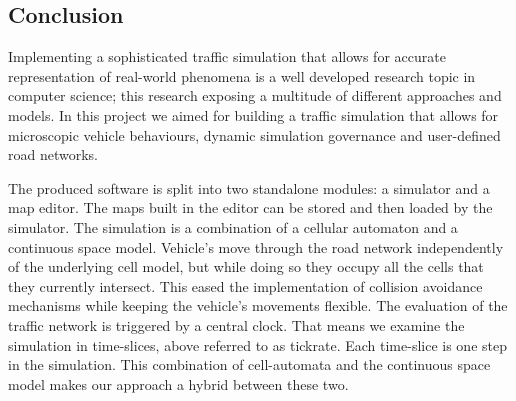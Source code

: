 \subsection*{Conclusion}
Implementing a sophisticated traffic simulation that allows for accurate representation of real-world phenomena is a well developed research topic in computer science; this research exposing a multitude of different approaches and models. In this project we aimed for building a traffic simulation that allows for microscopic vehicle behaviours, dynamic simulation governance and user-defined road networks. 

The produced software is split into two standalone modules: a simulator and a map editor. The maps built in the editor can be stored and then loaded by the simulator. The simulation is a combination of a cellular automaton and a continuous space model. Vehicle's move through the road network independently of the underlying cell model, but while doing so they occupy all the cells that they currently intersect. This eased the implementation of collision avoidance mechanisms while keeping the vehicle's movements flexible. The evaluation of the traffic network is triggered by a central clock. That means we examine the simulation in time-slices, above referred to as tickrate. Each time-slice is one step in the simulation. This combination of cell-automata and the continuous space model makes our approach a hybrid between these two.

